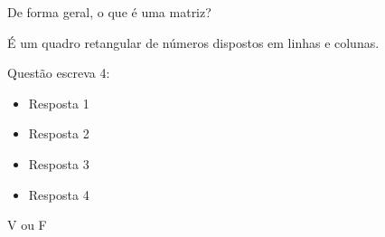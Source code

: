 \documentclass[pdftex, brazil, 12pt, oneside, addpoints]{exam}
\newcommand{\vf}[1][{}]{%
  \fillin[#1][0.25in]%
}
\begin{document}
\newpage

\begin{questions}
\setlength\linefillthickness{0.2pt}

\question
De forma geral, o que é uma matriz?
\begin{solutionorlines}[0.50in]
  É um quadro retangular de números dispostos em linhas e colunas.
\end{solutionorlines}

\question
Questão escreva 4:
\begin{solutionorlines}[0.75in]
  \begin{itemize}
  \vspace{-0.5cm}
  \item Resposta 1
  \item Resposta 2
  \item Resposta 3
  \item Resposta 4
  \end{itemize}
\end{solutionorlines}

\question
V ou F


\end{questions}
\end{document}
